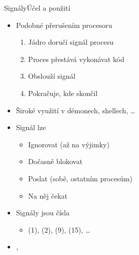 
\begin{frame}{Signály}{Účel a použití}

  \begin{itemize}
    \item Podobné přerušením procesoru
    \begin{enumerate}
      \item Jádro doručí signál procesu
      \item Proces přestává vykonávat kód
      \item Obslouží signál
      \item Pokračuje, kde skončil
    \end{enumerate}

    \pause

    \item Široké využití v démonech, shellech, \dots

    \pause

    \item Signál lze
    \begin{itemize}
      \item Ignorovat (až na výjimky)

      \pause

      \item Dočasně blokovat

      \pause

      \item Poslat (sobě, ostatním procesům)

      \pause

      \item Na něj čekat
    \end{itemize}

    \pause

    \item Signály jsou čísla
    \begin{itemize}
      \item {} (1),  (2),  (9),
         (15), \dots
    \end{itemize}

    \pause

    \item {}, 
  \end{itemize}

\end{frame}

\ifpcdirlinuxb

